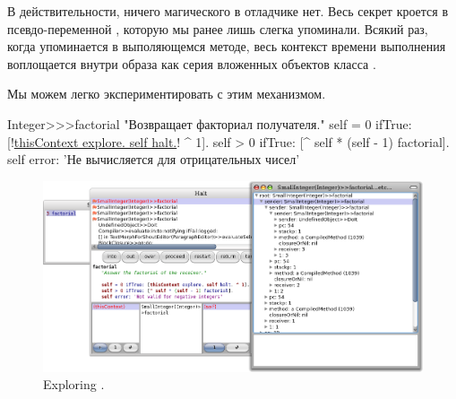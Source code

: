 \documentclass[a4paper,10pt,twoside]{book}
\begin{document}
В действительности, ничего магического в отладчике нет.
Весь секрет кроется в псевдо-переменной , которую мы ранее лишь слегка упоминали.
Всякий раз, когда  упоминается в выполяющемся методе, весь контекст времени выполнения воплощается внутри образа как серия вложенных объектов класса .

Мы можем легко экспериментировать с этим механизмом.


\begin{code}{}
Integer>>>factorial
	"Возвращает факториал получателя."
	self = 0 ifTrue: [!\underline{thisContext explore. self halt.}! ^ 1].
	self > 0 ifTrue: [^ self * (self - 1) factorial].
	self error: 'Не вычисляется для отрицательных чисел'
\end{code}


\begin{figure}[ht]\centering
	\includegraphics[width=\linewidth]{exploringThisContext}
	\caption{Exploring .}
\end{figure}
\end{document}
